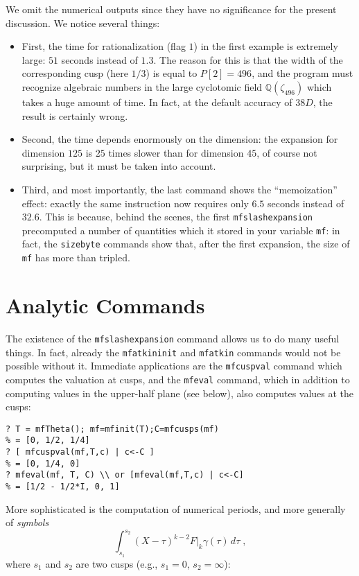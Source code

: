 \documentclass[11pt]{article}
\newcommand{\Q}{{\mathbb Q}}
\newcommand{\ga}{\gamma}
\def\kbd#1{{\tt #1}}
\begin{document}
We omit the numerical outputs since they have no significance for the present
discussion. We notice several things:
\begin{itemize}
\item First, the time for rationalization (flag $1$) in the first example
is extremely large: $51$ seconds instead of $1.3$. The reason for this is
that the width of the corresponding cusp (here $1/3$) is equal to $P[2]=496$,
and the program must recognize algebraic numbers in the large cyclotomic
field $\Q(\zeta_{496})$ which takes a huge amount of time. In fact, at the
default accuracy of $38D$, the result is certainly wrong.
\item Second, the time depends enormously on the dimension: the expansion
for dimension $125$ is $25$ times slower than for dimension $45$, of course
not surprising, but it must be taken into account.
\item Third, and most importantly, the last command shows the ``memoization''
effect: exactly the same instruction now requires only $6.5$ seconds instead
of $32.6$. This is because, behind the scenes, the first
\kbd{mfslashexpansion} precomputed a number of quantities which it stored
in your variable \kbd{mf}: in fact, the \kbd{sizebyte} commands show
that, after the first expansion, the size of \kbd{mf} has more than
tripled.
\end{itemize}

\section{Analytic Commands}

The existence of the \kbd{mfslashexpansion} command allows us to do many
useful things. In fact, already the \kbd{mfatkininit} and \kbd{mfatkin}
commands would not be possible without it. Immediate applications are the
\kbd{mfcuspval} command which computes the valuation at cusps, and the
\kbd{mfeval} command, which in addition to computing values in the upper-half
plane (see below), also computes values at the cusps:

\begin{verbatim}
? T = mfTheta(); mf=mfinit(T);C=mfcusps(mf)
% = [0, 1/2, 1/4]
? [ mfcuspval(mf,T,c) | c<-C ]
% = [0, 1/4, 0]
? mfeval(mf, T, C) \\ or [mfeval(mf,T,c) | c<-C]
% = [1/2 - 1/2*I, 0, 1]
\end{verbatim}

More sophisticated is the computation of numerical periods, and more
generally of \emph{symbols}
$$\int_{s_1}^{s_2}(X-\tau)^{k-2}F|_k\ga(\tau)\,d\tau\;,$$
where $s_1$ and $s_2$ are two cusps (e.g., $s_1=0$, $s_2=\infty$):
\end{document}
